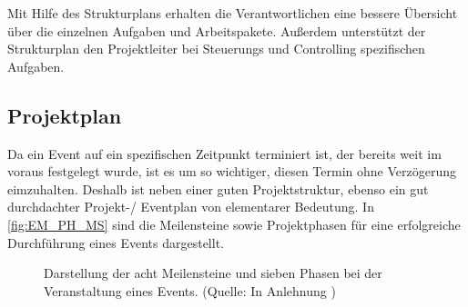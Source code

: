 Mit Hilfe des Strukturplans erhalten die Verantwortlichen eine bessere Übersicht über die einzelnen Aufgaben und Arbeitspakete.
Außerdem unterstützt der Strukturplan den Projektleiter bei Steuerungs und Controlling spezifischen Aufgaben.

\subsection{Projektplan}
Da ein Event auf ein spezifischen Zeitpunkt terminiert ist, der bereits weit im voraus festgelegt wurde, ist es um so wichtiger, diesen Termin ohne Verzögerung eimzuhalten.
Deshalb ist neben einer guten Projektstruktur, ebenso ein gut durchdachter Projekt-/ Eventplan von elementarer Bedeutung.
In \autoref{fig:EM_PH_MS} sind die  Meilensteine sowie Projektphasen für eine erfolgreiche Durchführung eines Events dargestellt.

\begin{figure}[H]
    \centering
    \setlength{\fboxsep}{10pt}
    \setlength{\fboxrule}{0.5pt}
    \caption[Eventmanagement: Meilensteine und Phase eines Events]{Darstellung der acht Meilensteine und sieben Phasen bei der Veranstaltung eines Events. (Quelle: In Anlehnung \autocite[Vgl.][S. 23]{Holzbaur.2002})} \label{fig:EM_PH_MS}
\end{figure}

